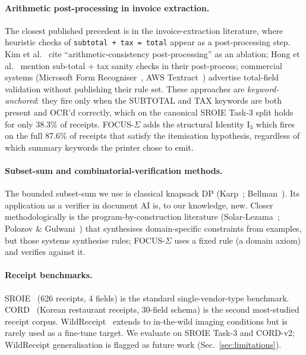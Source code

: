 \paragraph{Arithmetic post-processing in invoice extraction.}
The closest published precedent is in the invoice-extraction
literature, where heuristic checks of \texttt{subtotal + tax = total}
appear as a post-processing step.  Kim et al.~\cite{kim2022donut} cite
``arithmetic-consistency post-processing'' as an ablation;
Hong et al.~\cite{hong2022bros} mention sub-total + tax sanity checks
in their post-process; commercial systems
(Microsoft Form Recogniser~\cite{azure-form-recogniser},
AWS Textract~\cite{aws-textract}) advertise total-field validation
without publishing their rule set.  These approaches are
\emph{keyword-anchored}: they fire only when the \textsf{SUBTOTAL}
and \textsf{TAX} keywords are both present and OCR'd correctly, which
on the canonical SROIE Task-3 split holds for only 38.3\% of
receipts.  FOCUS-$\Sigma$ adds the structural Identity $\mathrm{I}_3$
which fires on the full 87.6\% of receipts that satisfy the
itemisation hypothesis, regardless of which summary keywords the
printer chose to emit.

\paragraph{Subset-sum and combinatorial-verification methods.}
The bounded subset-sum we use is classical knapsack DP
(Karp~\cite{karp1972reducibility}; Bellman~\cite{bellman1957dynamic}).
Its application as a verifier in document AI is, to our knowledge,
new.  Closer methodologically is the program-by-construction
literature
(Solar-Lezama~\cite{solarlezama2008program};
Polozov \& Gulwani~\cite{polozov2015flashmeta}) that synthesises
domain-specific constraints from examples, but those systems
synthesise rules; FOCUS-$\Sigma$ uses a fixed rule (a domain axiom)
and verifies against it.

\paragraph{Receipt benchmarks.}  SROIE~\cite{huang2019icdar} (626
receipts, 4 fields) is the standard single-vendor-type benchmark.
CORD~\cite{park2019cord} (Korean restaurant receipts, 30-field
schema) is the second most-studied receipt corpus.
WildReceipt~\cite{sun2021wildreceipt} extends to in-the-wild
imaging conditions but is rarely used as a fine-tune target.
We evaluate on SROIE Task-3 and CORD-v2; WildReceipt
generalisation is flagged as future work
(Sec.~\ref{sec:limitations}).
